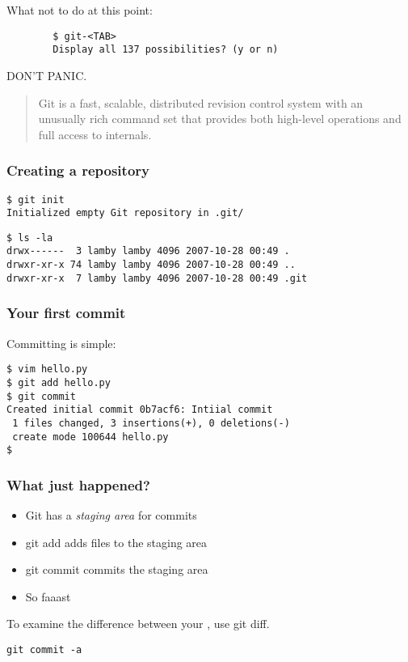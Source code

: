 \documentclass{beamer}
\begin{document}
\begin{frame}[fragile]
    What not to do at this point:

    \begin{verbatim}
        $ git-<TAB>
        Display all 137 possibilities? (y or n)
    \end{verbatim}

    DON'T PANIC.

    \begin{quote}
    Git is a fast, scalable, distributed revision control system with an
    unusually \alert{rich command set that provides both high-level operations and
    full access to internals}.
    \end{quote}

\end{frame}

\begin{frame}[fragile]
    \frametitle{Creating a repository}

    \begin{verbatim}
$ git init
Initialized empty Git repository in .git/
    \end{verbatim}

    \begin{verbatim}
$ ls -la
drwx------  3 lamby lamby 4096 2007-10-28 00:49 .
drwxr-xr-x 74 lamby lamby 4096 2007-10-28 00:49 ..
drwxr-xr-x  7 lamby lamby 4096 2007-10-28 00:49 .git
    \end{verbatim}
\end{frame}

\begin{frame}[fragile]
    \frametitle{Your first commit}

    Committing is simple:

    \begin{verbatim}
$ vim hello.py
$ git add hello.py
$ git commit
Created initial commit 0b7acf6: Intiial commit
 1 files changed, 3 insertions(+), 0 deletions(-)
 create mode 100644 hello.py
$
    \end{verbatim}

\end{frame}

\begin{frame}[fragile]
    \frametitle{What just happened?}

    \begin{itemize}
        \item Git has a \emph{staging area} for commits
        \item \alert{git add} adds files to the staging area
        \item \alert{git commit} commits the staging area
        \item So faaast
    \end{itemize}

    To examine the difference between your , use \alert{git diff}.

    \verb#git commit -a#

\end{frame}
\end{document}

